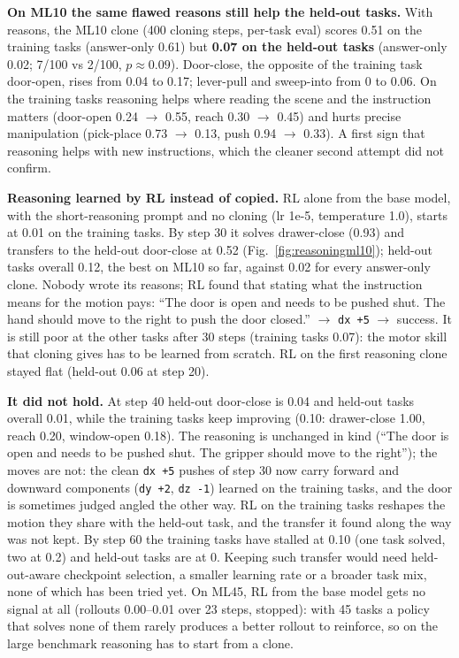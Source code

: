 \documentclass[11pt]{article}
\newcommand{\code}[1]{\texttt{#1}}
\begin{document}
\textbf{On ML10 the same flawed reasons still help the held-out tasks.} With reasons, the ML10 clone (400 cloning steps,
per-task eval) scores 0.51 on the training tasks (answer-only 0.61) but \textbf{0.07 on the held-out tasks} (answer-only
0.02; 7/100 vs 2/100, $p \approx 0.09$). Door-close, the opposite of the training task door-open, rises from 0.04 to 0.17;
lever-pull and sweep-into from 0 to 0.06. On the training tasks reasoning helps where reading the scene and the instruction
matters (door-open 0.24 $\to$ 0.55, reach 0.30 $\to$ 0.45) and hurts precise manipulation (pick-place 0.73 $\to$ 0.13, push
0.94 $\to$ 0.33). A first sign that reasoning helps with new instructions, which the cleaner second attempt did not confirm.

\textbf{Reasoning learned by RL instead of copied.} RL alone from the base model, with the short-reasoning prompt and
no cloning (lr 1e-5, temperature 1.0), starts at 0.01 on the training tasks. By step 30 it solves drawer-close (0.93)
and transfers to the held-out door-close at 0.52 (Fig.~\ref{fig:reasoningml10}); held-out tasks overall 0.12, the best on
ML10 so far, against 0.02 for every answer-only clone.
Nobody wrote its reasons; RL found that stating what the instruction
means for the motion pays: ``The door is open and needs to be pushed shut. The hand should move to the right to push the
door closed.'' $\to$ \code{dx +5} $\to$ success. It is still poor at the other tasks after 30 steps (training tasks
0.07): the motor skill that cloning gives has to be learned from scratch. RL on the first reasoning clone stayed flat
(held-out 0.06 at step 20).

\textbf{It did not hold.} At step 40 held-out door-close is 0.04 and held-out tasks overall 0.01, while the training tasks
keep improving (0.10: drawer-close 1.00, reach 0.20, window-open 0.18). The reasoning is unchanged in kind (``The door is
open and needs to be pushed shut. The gripper should move to the right''); the moves are not: the clean \code{dx +5} pushes
of step 30 now carry forward and downward components (\code{dy +2}, \code{dz -1}) learned on the training tasks, and the
door is sometimes judged angled the other way. RL on the training tasks reshapes the motion they share with the held-out
task, and the transfer it found along the way was not kept. By step 60 the training tasks have stalled at 0.10 (one task
solved, two at 0.2) and held-out tasks are at 0. Keeping such transfer would need held-out-aware checkpoint selection, a
smaller learning rate or a broader task mix, none of which has been tried yet. On ML45, RL from the base model gets no
signal at all (rollouts 0.00--0.01 over 23 steps, stopped): with 45 tasks a policy that solves none of them rarely
produces a better rollout to reinforce, so on the large benchmark reasoning has to start from a clone.
\end{document}
